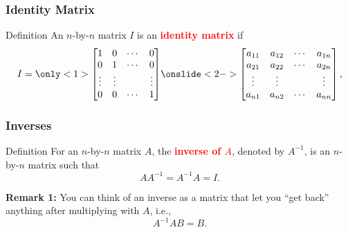 \begin{frame}
  \frametitle{Identity Matrix}

  \begin{block}{Definition}
    An $n$-by-$n$ matrix $I$ is an \textcolor{red}{\bf identity
      matrix} if
    \[
    I=
    \only<1>{
    \begin{bmatrix}
      1 & 0 & \cdots & 0 \\
      0 & 1 & \cdots & 0 \\
      \vdots & \vdots &  & \vdots \\
      0 & 0 & \cdots & 1 \\
    \end{bmatrix}
    }
    \onslide<2->{
    \begin{bmatrix}
      a_{11} & a_{12} & \cdots & a_{1n} \\
      a_{21} & a_{22} & \cdots & a_{2n} \\
      \vdots & \vdots &  & \vdots \\
      a_{n1} & a_{n2} & \cdots & a_{nn} \\
    \end{bmatrix},
    }
    \]
  \end{block}
  
\end{frame}

\begin{frame}
  \frametitle{Inverses}

  \begin{block}{Definition}
    For an $n$-by-$n$ matrix $A$, the \textcolor{red}{\bf inverse of
      $A$}, denoted by $A^{-1}$, is an $n$-by-$n$ matrix such that
    \[
    AA^{-1}=A^{-1}A=I.
    \]
  \end{block}

  {\small

    {\bf Remark 1:} You can think of an inverse as a matrix that let
    you ``get back'' anything after multiplying with $A$, i.e.,
    \[
    A^{-1}AB = B.
    \]
    
  
  }
\end{frame}


